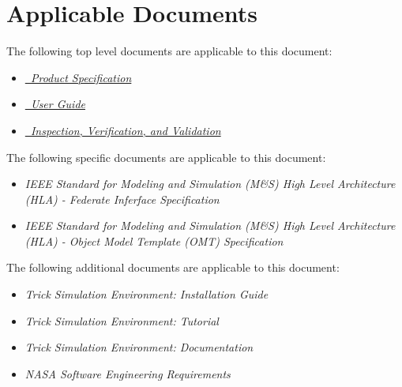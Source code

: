 \documentclass[twoside,11pt,titlepage]{report}
\begin{document}
\section{Applicable Documents}
The following top level documents are applicable to this document:

\begin{itemize}
\item{\href{file:TrickHLASpec.pdf}
           {\em \TrickHLA\ Product Specification}}
\cite{trickhlaenv:TrickHLASpec}

\item{\href{file:TrickHLAUser.pdf}
           {\em \TrickHLA\ User Guide}}
\cite{trickhlaenv:TrickHLAUser}

\item{\href{file:TrickHLAIVV.pdf}
           {\em \TrickHLA\ Inspection, Verification, and Validation}}
\cite{trickhlaenv:TrickHLAIVV}

\end{itemize}

The following specific documents are applicable to this document:

\begin{itemize}
\item{\em IEEE Standard for Modeling and Simulation (M\&S) High Level
          Architecture (HLA) - Federate Inferface Specification}
\cite{IEEE1516:API}

\item{\em IEEE Standard for Modeling and Simulation (M\&S) High Level
              Architecture (HLA) - Object Model Template (OMT) Specification}
\cite{IEEE1516:OMT}

\end{itemize}

The following additional documents are applicable to this document:

\begin{itemize}
\item{\em Trick Simulation Environment: Installation Guide}
\cite{Trick:Install}

\item{\em Trick Simulation Environment: Tutorial}
\cite{Trick:Tutorial}

\item{\em Trick Simulation Environment: Documentation}
\cite{Trick:Documentation}

\item{\em NASA Software Engineering Requirements}
\cite{NASA:SWE}

\end{itemize}
\end{document}
